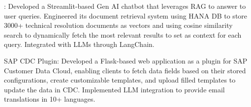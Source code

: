 
   {\projectentry
    {:} {Developed a Streamlit-based Gen AI chatbot that leverages RAG to answer to user queries. Engineered its document retrieval system using HANA DB to store 3000+ technical resolution documents as vectors and using cosine similarity search to dynamically fetch the most relevant results to set as context for each query. Integrated with LLMs through LangChain.} 
    }

    {\projectentry
    {SAP CDC Plugin:} {Developed a Flask-based web application as a plugin for SAP Customer Data Cloud, enabling clients to fetch data fields based on their stored configurations, create customizable templates, and upload filled templates to update the data in CDC. Implemented LLM integration to provide email translations in 10+ languages.} 
    }
    